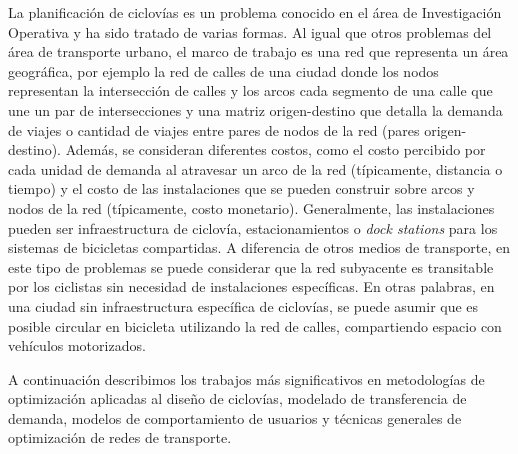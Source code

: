 

  La planificación de ciclovías es un problema conocido en el área de Investigación Operativa y ha sido tratado de varias formas. Al igual que otros problemas del área de transporte urbano, el marco de trabajo es una red que representa un área geográfica, por ejemplo la red de calles de una ciudad donde los nodos representan la intersección de calles y los arcos cada segmento de una calle que une un par de intersecciones y una matriz origen-destino que detalla la demanda de viajes o cantidad de viajes entre pares de nodos de la red (pares origen-destino). Además, se consideran diferentes costos, como el costo percibido por cada unidad de demanda al atravesar un arco de la red (típicamente, distancia o tiempo) y el costo de las instalaciones que se pueden construir sobre arcos y nodos de la red (típicamente, costo monetario). Generalmente, las instalaciones pueden ser infraestructura de ciclovía, estacionamientos o {\it dock stations} para los sistemas de bicicletas compartidas. A diferencia de otros medios de transporte, en este tipo de problemas se puede considerar que la red subyacente es transitable por los ciclistas sin necesidad de instalaciones específicas. En otras palabras, en una ciudad sin infraestructura específica de ciclovías, se puede asumir que es posible circular en bicicleta utilizando la red de calles, compartiendo espacio con vehículos motorizados.

  A continuación describimos los trabajos más significativos en metodologías de optimización aplicadas al diseño de ciclovías, modelado de transferencia de demanda, modelos de comportamiento de usuarios y técnicas generales de optimización de redes de transporte.

